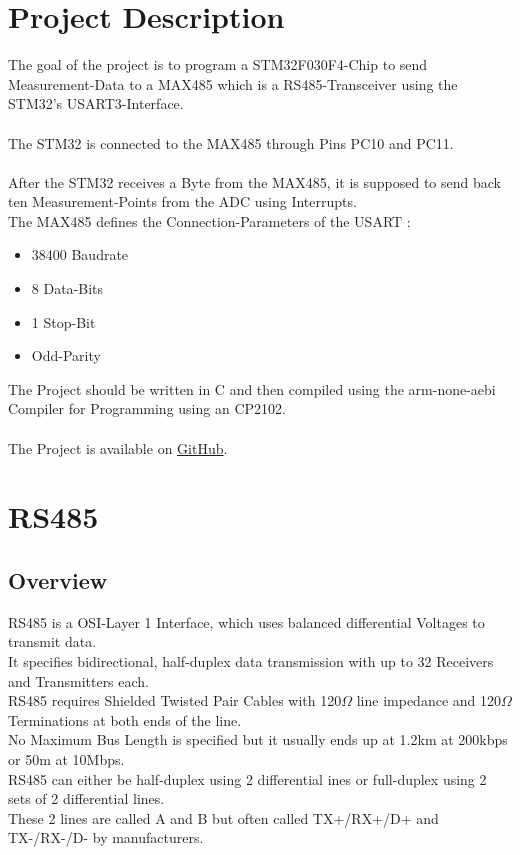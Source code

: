 \section{Project Description}
\label{sec:ProjDesc}

The goal of the project is to program a STM32F030F4-Chip to send Measurement-Data
to a MAX485 which is a RS485-Transceiver using the STM32's USART3-Interface.\\ \\
The STM32 is connected to the MAX485 through Pins PC10 and PC11.\\ \\
After the STM32 receives a Byte from the MAX485, it is supposed to send back
ten Measurement-Points from the ADC using Interrupts.\\
The MAX485 defines the Connection-Parameters of the USART :
\begin{itemize}
	\item 38400 Baudrate
	\item 8 Data-Bits
	\item 1 Stop-Bit
	\item Odd-Parity
\end{itemize}
The Project should be written in C and then compiled using the arm-none-aebi Compiler for Programming using an CP2102.\\ \\
The Project is available on \href{https://github.com/davirieser/uC_Comm}{GitHub}.

\pagebreak

\section{RS485}
\label{sec:RS485}

\subsection{Overview}
\label{subsec:RS_Over}

RS485 is a OSI-Layer 1 Interface, which uses balanced differential Voltages to transmit data.\\
It specifies bidirectional, half-duplex data transmission with up to 32 Receivers and Transmitters each.\\
RS485 requires Shielded Twisted Pair Cables with 120$\Omega$ line impedance and 120$\Omega$ Terminations at both ends of the line.\\
No Maximum Bus Length is specified but it usually ends up at 1.2km at 200kbps or 50m at 10Mbps.\\
RS485 can either be half-duplex using 2 differential ines or full-duplex using 2 sets of 2 differential lines.\\
These 2 lines are called A and B but often called TX+/RX+/D+ and TX-/RX-/D- by manufacturers.

